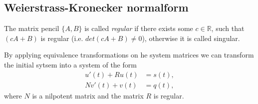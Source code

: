 	\subsection{Weierstrass-Kronecker normalform}
	
	\begin{frame}
		\begin{definition}
			The matrix pencil $\{ A,B\}$ is called \emph{regular} if there exists some $c \in \mathbb{R}$, such that $(cA+B)$ is regular (i.e. $det(cA+B) \neq 0$), otherwise it is called singular.
		\end{definition}
		
			By applying equivalence transformations on he system matrices we can transform the initial sytsem into a system of the form
		\begin{equation}
			\label{transformed-DAE-const-coeff}
			\begin{aligned}
				u'(t) + Ru(t) &= s(t), \\
				Nv'(t) + v(t) &= q(t),
			\end{aligned}
		\end{equation}
		where $N$ is a nilpotent matrix and the matrix $R$ is regular.
	\end{frame}
	
